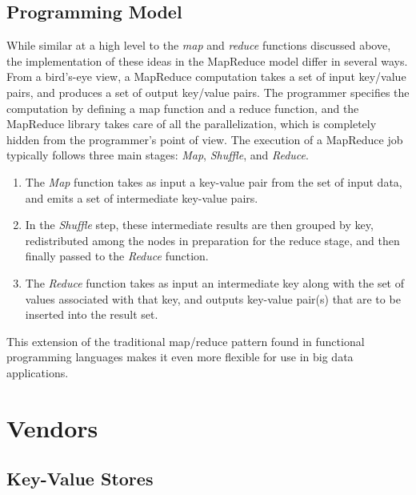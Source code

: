 \documentclass[11pt,a4paper]{report}
\begin{document}
\subsection{Programming Model}
While similar at a high level to the \textit{map} and \textit{reduce} functions discussed above, the implementation of these ideas in the MapReduce model differ in several ways. From a bird's-eye view, a MapReduce computation takes a set of input key/value pairs, and produces a set of output key/value pairs. The programmer specifies the computation by defining a map function and a reduce function, and the MapReduce library takes care of all the parallelization, which is completely hidden from the programmer's point of view. The execution of a MapReduce job typically follows three main stages: \textit{Map}, \textit{Shuffle}, and \textit{Reduce}. 
\begin{enumerate}
\item The \textit{Map} function takes as input a key-value pair from the set of input data, and emits a set of intermediate key-value pairs. 
\item In the \textit{Shuffle} step, these intermediate results are then grouped by key, redistributed among the nodes in preparation for the reduce stage, and then finally passed to the \textit{Reduce} function. 
\item The \textit{Reduce} function takes as input an intermediate key along with the set of values associated with that key, and outputs key-value pair(s) that are to be inserted into the result set.\cite{dean2008mapreduce}
\end{enumerate}
This extension of the traditional map/reduce pattern found in functional programming languages makes it even more flexible for use in big data applications.

\section{Vendors}
\subsection{Key-Value Stores}
\end{document}
